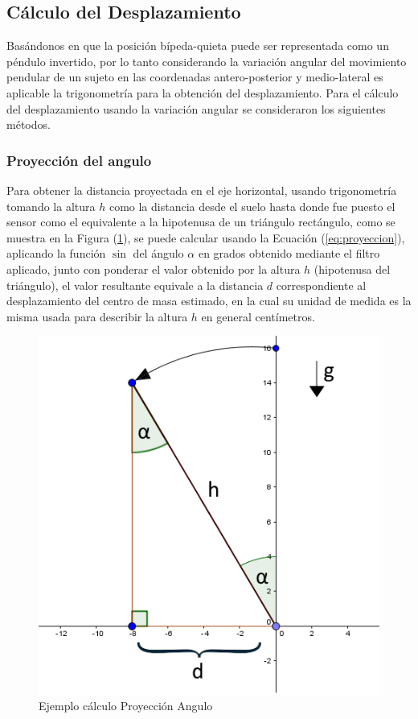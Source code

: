 \documentclass[12pt,a4paper]{article}
\begin{document}
\subsection{Cálculo del Desplazamiento}
Basándonos en que la posición bípeda-quieta puede ser representada como un péndulo invertido, por lo tanto considerando la variación angular del movimiento pendular de un sujeto en las coordenadas antero-posterior y medio-lateral es aplicable la trigonometría para la obtención del desplazamiento.
Para el cálculo del desplazamiento usando la variación angular se consideraron los siguientes métodos. 

\subsubsection{Proyección del angulo}
Para obtener la distancia proyectada en el eje horizontal, usando trigonometría tomando la altura $h$ como la distancia desde el suelo hasta donde fue puesto el sensor como el equivalente a la hipotenusa de un triángulo rectángulo, como se muestra en la Figura (\ref{fig:proyeccion}), se puede calcular usando la Ecuación (\ref{eq:proyeccion}), aplicando la función $\sin$ del ángulo $\alpha$ en grados obtenido mediante el filtro aplicado, junto con ponderar el valor obtenido por la altura $h$ (hipotenusa del triángulo), el valor resultante equivale a la distancia $d$ correspondiente al desplazamiento del centro de masa estimado, en la cual su unidad de medida es la misma usada para describir la altura $h$ en general centímetros.

\begin{figure}[H]
	\centering
	\includegraphics[scale=0.6]{images/calculoProyeccion}
	\caption{Ejemplo cálculo Proyección Angulo}
	\label{fig:proyeccion}
\end{figure}
\end{document}
